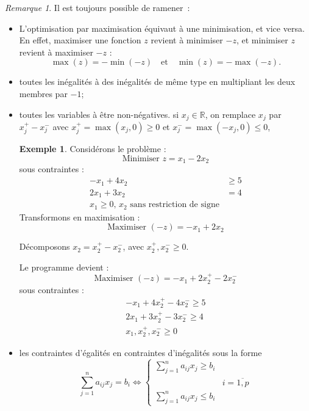 \documentclass[a4paper,12pt,openany]{book}
\theoremstyle{plain}
\theoremstyle{definition}
\newtheorem{exemple}[theorem]{Exemple}
\theoremstyle{remark}
\newtheorem{remarque}[theorem]{Remarque}
\theoremstyle{nbstyle}
\begin{document}
	\begin{remarque}
		Il est toujours possible de ramener :
		
		\begin{itemize}
			\item[$\diamond $] L'optimisation par maximisation équivaut à une minimisation, et vice versa. En effet, maximiser une fonction \( z \) revient à minimiser \(-z\), et minimiser \( z \) revient à maximiser \(-z\) :
			\begin{equation}
			\displaystyle\max(z) = -\displaystyle\min(-z) \quad \text{et} \quad \displaystyle\min(z) = -\displaystyle\max(-z).
			\end{equation}
			\item[$\diamond $] toutes les inégalités à des inégalités de même type en multipliant les deux membres par \(-1\);
			\item[$\diamond $] toutes les variables à être non-négatives.
			si $ x_{j}\in\mathbb{R} $, on remplace $ x_{j} $ par $ x_{j}^{+}-x_{j}^{-} $ avec $ x_{j}^{+}=\displaystyle\max(x_{j},0)\geq0 $ et $ x_{j}^{-}=\displaystyle\max(-x_{j},0)\leq0 $,
			
			\begin{exemple}
				Considérons le problème :
				\[
				\text{Minimiser } z = x_1 - 2x_2
				\]
				sous contraintes :
				\[
				\begin{aligned}
				-x_1 + 4x_2 &\geq 5 \\
				2x_1 + 3x_2 &= 4 \\
				x_1 \geq 0, \, x_2 \text{ sans restriction de signe}
				\end{aligned}
				\]
				Transformons en maximisation :
				\[
				\text{Maximiser } (-z) = -x_1 + 2x_2
				\]
				
				Décomposons $x_2 = x_2^+ - x_2^-$, avec $x_2^+, x_2^- \geq 0$. 
				
				Le programme devient :
				\[
				\text{Maximiser } (-z) = -x_1 + 2x_2^+ - 2x_2^-
				\]
				sous contraintes :
				\[
				\begin{aligned}
				-x_1 + 4x_2^+ - 4x_2^- \geq 5 \\
				2x_1 + 3x_2^+ - 3x_2^- \geq 4 \\
				x_1, x_2^+, x_2^-\geq 0
				\end{aligned}
				\]
			\end{exemple}
			\item[$\diamond $] les contraintes d'égalités en contraintes d'inégalités sous la forme
			\begin{equation}\label{key}
			\sum_{j=1}^{n}a_{ij}x_{j}=b_{i}\Leftrightarrow\left\lbrace \begin{array}{cc}
			\displaystyle\sum_{j=1}^{n}a_{ij}x_{j}\geq b_{i}&\\
			&i=\overline{1,p}\\
			\displaystyle\sum_{j=1}^{n}a_{ij}x_{j}\leq b_{i}&
			\end{array}\right. 
			\end{equation}
		\end{itemize}
	\end{remarque}
	
\end{document}
